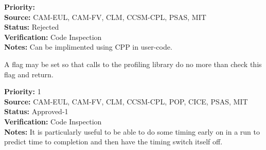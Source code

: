 \begin{reqlist}
{\bf Priority:}  \\
{\bf Source:} CAM-EUL, CAM-FV, CLM, CCSM-CPL, PSAS, MIT \\
{\bf Status:} Rejected \\
{\bf Verification:} Code Inspection \\
{\bf Notes:} Can be implimented using CPP in user-code.
\end{reqlist}


A flag may be set so that calls to the profiling library do no more than check
this flag and return.

\begin{reqlist}
{\bf Priority:} 1 \\
{\bf Source:} CAM-EUL, CAM-FV, CLM, CCSM-CPL, POP, CICE, PSAS, MIT \\
{\bf Status:} Approved-1 \\
{\bf Verification:} Code Inspection \\
{\bf Notes:} It is particularly useful to be able to do some timing
early on in a run to predict time to completion and then have
the timing switch itself off.
\end{reqlist}

